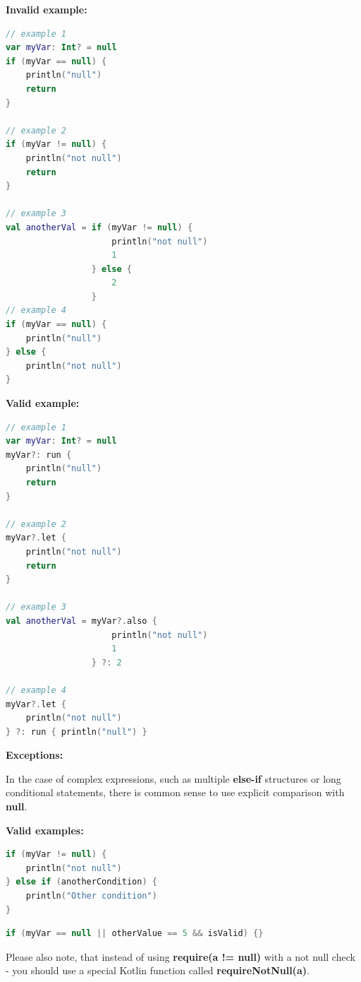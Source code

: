 \textbf{Invalid example:}

\begin{lstlisting}[language=Kotlin]
// example 1
var myVar: Int? = null
if (myVar == null) {
    println("null")
    return
}

// example 2
if (myVar != null) {
    println("not null")
    return
}

// example 3
val anotherVal = if (myVar != null) {
                     println("not null")
                     1
                 } else {
                     2
                 }
// example 4
if (myVar == null) {
    println("null")
} else {
    println("not null")
}
\end{lstlisting}


\textbf{Valid example:}

\begin{lstlisting}[language=Kotlin]
// example 1
var myVar: Int? = null
myVar?: run {
    println("null")
    return
}

// example 2
myVar?.let {
    println("not null")
    return
}

// example 3
val anotherVal = myVar?.also {
                     println("not null")
                     1
                 } ?: 2

// example 4
myVar?.let {
    println("not null")
} ?: run { println("null") }
\end{lstlisting}


\textbf{Exceptions:}



In the case of complex expressions, such as multiple \textbf{else-if} structures or long conditional statements, there is common sense to use explicit comparison with \textbf{null}.



\textbf{Valid examples:}



\begin{lstlisting}[language=Kotlin]
if (myVar != null) {
    println("not null")
} else if (anotherCondition) {
    println("Other condition")
}
\end{lstlisting}


\begin{lstlisting}[language=Kotlin]
if (myVar == null || otherValue == 5 && isValid) {}
\end{lstlisting}


Please also note, that instead of using \textbf{require(a != null)} with a not null check - you should use a special Kotlin function called \textbf{requireNotNull(a)}.



